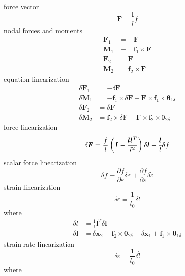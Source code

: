 \documentclass[10pt,fleqn,subeqn]{report}
\newcommand{\T}[1]{\bm{#1}}
\begin{document}
force vector
\begin{equation}
	\T{F} = \frac{\T{l}}{l} f
\end{equation}
nodal forces and moments
\begin{subequations}
\begin{align}
	\T{F}_1 &= -\T{F} \\
	\T{M}_1 &= -\T{f}_1 \times \T{F} \\
	\T{F}_2 &= \T{F} \\
	\T{M}_2 &= \T{f}_2 \times \T{F}
\end{align}
\end{subequations}
equation linearization
\begin{subequations}
\begin{align}
	\delta\T{F}_1 &= -\delta\T{F} \\
	\delta\T{M}_1 &= -\T{f}_1 \times \delta\T{F} - \T{F}\times\T{f}_1\times \T{\theta}_{1\delta} \\
	\delta\T{F}_2 &= \delta\T{F} \\
	\delta\T{M}_2 &= \T{f}_2 \times \delta\T{F} + \T{F}\times\T{f}_2\times \T{\theta}_{2\delta}
\end{align}
\end{subequations}
force linearization
\begin{equation}
	\delta\T{F} = \frac{f}{l}\plbr{\T{I} - \frac{\T{l}\T{l}^T}{l^2}} \delta\T{l} + \frac{\T{l}}{l} \delta{f}
\end{equation}
scalar force linearization
\begin{equation}
	\delta{f} = \frac{\partial{f}}{\partial\varepsilon} \delta\varepsilon
	+ \frac{\partial{f}}{\partial\dot{\varepsilon}} \delta\dot{\varepsilon}
\end{equation}
strain linearization
\begin{equation}
	\delta\varepsilon = \frac{1}{l_0}\delta{l}
\end{equation}
where
\begin{subequations}
\begin{align}
	\delta{l} &= \frac{1}{l}\T{l}^T \delta\T{l} \\
	\delta\T{l} &= \delta\T{x}_2 - \T{f}_2 \times \T{\theta}_{2\delta}
		- \delta\T{x}_1 + \T{f}_1 \times \T{\theta}_{1\delta}
\end{align}
\end{subequations}
strain rate linearization
\begin{equation}
	\delta\dot{\varepsilon} = \frac{1}{l_0} \delta\dot{l}
\end{equation}
where
\end{document}
